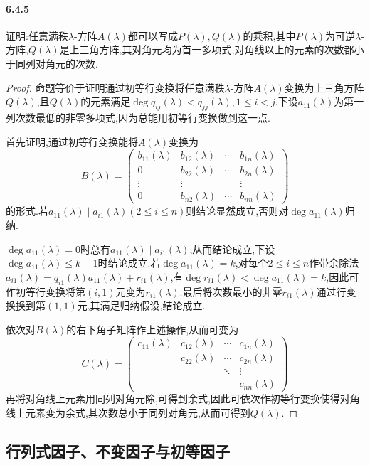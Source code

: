 \documentclass[11pt]{article}
\begin{document}
\paragraph{6.4.5}证明:任意满秩$\lambda$-方阵$A(\lambda)$都可以写成$P(\lambda), Q(\lambda)$的乘积,其中$P(\lambda)$为可逆$\lambda$-方阵,$Q(\lambda)$是上三角方阵,其对角元均为首一多项式,对角线以上的元素的次数都小于同列对角元的次数.
\begin{proof}
    命题等价于证明通过初等行变换将任意满秩$\lambda$-方阵$A(\lambda)$变换为上三角方阵$Q(\lambda)$,且$Q(\lambda)$的元素满足$\deg q_{ij}(\lambda)<q_{jj}(\lambda), 1\leq i<j$.下设$a_{11}(\lambda)$为第一列次数最低的非零多项式,因为总能用初等行变换做到这一点.

    首先证明,通过初等行变换能将$A(\lambda)$变换为
    $$B(\lambda)=\begin{pmatrix}
        b_{11}(\lambda) & b_{12}(\lambda) & \cdots & b_{1n}(\lambda)\\
        0 & b_{22}(\lambda) & \cdots & b_{2n}(\lambda)\\
        \vdots & \vdots & & \vdots\\
        0 & b_{n2}(\lambda) & \cdots & b_{nn}(\lambda)
    \end{pmatrix}$$
    的形式.若$a_{11}(\lambda)\mid a_{i1}(\lambda) (2\leq i\leq n)$则结论显然成立,否则对$\deg a_{11}(\lambda)$归纳.
    
    $\deg a_{11}(\lambda)=0$时总有$a_{11}(\lambda)\mid a_{i1}(\lambda)$,从而结论成立,下设$\deg a_{11}(\lambda)\leq k-1$时结论成立.若$\deg a_{11}(\lambda)=k$,对每个$2\leq i\leq n$作带余除法$a_{i1}(\lambda)=q_{i1}(\lambda)a_{11}(\lambda)+r_{i1}(\lambda)$,有$\deg r_{i1}(\lambda)< \deg a_{11}(\lambda)=k$,因此可作初等行变换将第$(i,1)$元变为$r_{i1}(\lambda)$.最后将次数最小的非零$r_{i1}(\lambda)$通过行变换换到第$(1,1)$元,其满足归纳假设,结论成立.

    依次对$B(\lambda)$的右下角子矩阵作上述操作,从而可变为
    $$C(\lambda)=\begin{pmatrix}
        c_{11}(\lambda) & c_{12}(\lambda) & \cdots & c_{1n}(\lambda)\\
         & c_{22}(\lambda) & \cdots & c_{2n}(\lambda)\\
         &  &  \ddots & \vdots\\
         &  &  & c_{nn}(\lambda)
    \end{pmatrix}$$
    再将对角线上元素用同列对角元除,可得到余式,因此可依次作初等行变换使得对角线上元素变为余式,其次数总小于同列对角元,从而可得到$Q(\lambda)$.
\end{proof}
\subsection{行列式因子、不变因子与初等因子}
\end{document}
